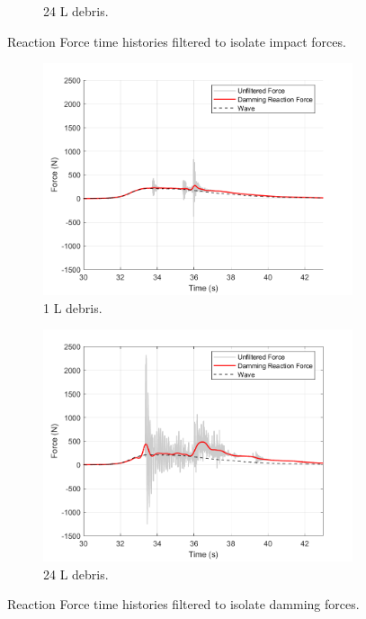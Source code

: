 \documentclass{article}
\begin{document}
{\begin{figure}[h!]
\begin{subfigure}[b]{0.48\textwidth}
        \caption{24 L debris.}
        \label{fig:timehist_24L_peak}
    \end{subfigure}
    \caption{Reaction Force time histories filtered to isolate impact forces.}
    \label{fig:timehist_combined}
\end{figure}

\begin{figure}[h!]
    \centering
    \begin{subfigure}[b]{0.48\textwidth}
        \centering
        \includegraphics[width=\textwidth]{Reg_Lift_U_1_L_D__Masters_NHERIDeprisImpact2_goodtests_Reg_Lift_U_1_L_Trial04_Damming.png}
        \caption{1 L debris.}
        \label{fig:timehist_1L_damming}
    \end{subfigure}
    \hfill
    \begin{subfigure}[b]{0.48\textwidth}
        \centering
        \includegraphics[width=\textwidth]{Reg_Lift_U_24_L_D__Masters_NHERIDeprisImpact2_goodtests_Reg_Lift_U_24_L_Trial04_Damming.png}
        \caption{24 L debris.}
        \label{fig:timehist_24L_damming}
    \end{subfigure}
    \caption{Reaction Force time histories filtered to isolate damming forces.}
    \label{fig:timehist_damming_combined}
\end{figure}


}
\end{document}
